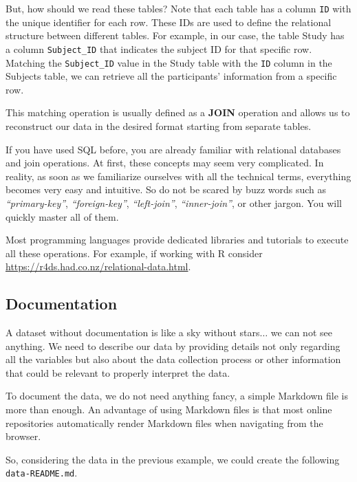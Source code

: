 \documentclass[
  11pt,
]{book}
\begin{document}
\begin{itemize}
  But, how should we read these tables? Note that each table has a column \texttt{ID} with the unique identifier for each row. These IDs are used to define the relational structure between different tables. For example, in our case, the table Study has a column \texttt{Subject\_ID} that indicates the subject ID for that specific row. Matching the \texttt{Subject\_ID} value in the Study table with the \texttt{ID} column in the Subjects table, we can retrieve all the participants' information from a specific row.

  This matching operation is usually defined as a \textbf{JOIN} operation and allows us to reconstruct our data in the desired format starting from separate tables.
\end{itemize}

If you have used SQL before, you are already familiar with relational databases and join operations. At first, these concepts may seem very complicated. In reality, as soon as we familiarize ourselves with all the technical terms, everything becomes very easy and intuitive. So do not be scared by buzz words such as \emph{``primary-key''}, \emph{``foreign-key''}, \emph{``left-join''}, \emph{``inner-join''}, or other jargon. You will quickly master all of them.

Most programming languages provide dedicated libraries and tutorials to execute all these operations. For example, if working with R consider \url{https://r4ds.had.co.nz/relational-data.html}.

\hypertarget{data-docs}{%
\subsection{Documentation}\label{data-docs}}

A dataset without documentation is like a sky without stars\(\ldots\) we can not see anything. We need to describe our data by providing details not only regarding all the variables but also about the data collection process or other information that could be relevant to properly interpret the data.

To document the data, we do not need anything fancy, a simple Markdown file is more than enough. An advantage of using Markdown files is that most online repositories automatically render Markdown files when navigating from the browser.

So, considering the data in the previous example, we could create the following \texttt{data-README.md}.
\end{document}
